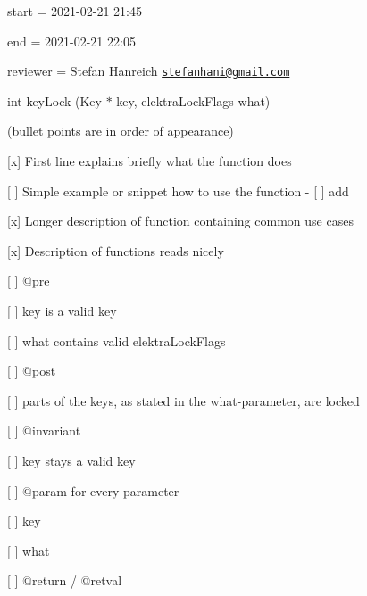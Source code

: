 
\begin{DoxyItemize}
\item start = 2021-\/02-\/21 21\+:45
\item end = 2021-\/02-\/21 22\+:05
\item reviewer = Stefan Hanreich \href{mailto:stefanhani@gmail.com}{\tt stefanhani@gmail.\+com}
\end{DoxyItemize}

{\ttfamily int key\+Lock (Key $\ast$ key, elektra\+Lock\+Flags what)}

(bullet points are in order of appearance)


\begin{DoxyItemize}
\item \mbox{[}x\mbox{]} First line explains briefly what the function does
\item \mbox{[} \mbox{]} Simple example or snippet how to use the function -\/ \mbox{[} \mbox{]} add
\item \mbox{[}x\mbox{]} Longer description of function containing common use cases
\item \mbox{[}x\mbox{]} Description of functions reads nicely
\item \mbox{[} \mbox{]} {\ttfamily @pre}
\begin{DoxyItemize}
\item \mbox{[} \mbox{]} key is a valid key
\item \mbox{[} \mbox{]} what contains valid elektra\+Lock\+Flags
\end{DoxyItemize}
\item \mbox{[} \mbox{]} {\ttfamily @post}
\begin{DoxyItemize}
\item \mbox{[} \mbox{]} parts of the keys, as stated in the what-\/parameter, are locked
\end{DoxyItemize}
\item \mbox{[} \mbox{]} {\ttfamily @invariant}
\begin{DoxyItemize}
\item \mbox{[} \mbox{]} key stays a valid key
\end{DoxyItemize}
\item \mbox{[} \mbox{]} {\ttfamily @param} for every parameter
\begin{DoxyItemize}
\item \mbox{[} \mbox{]} key
\item \mbox{[} \mbox{]} what
\end{DoxyItemize}
\item \mbox{[} \mbox{]} {\ttfamily @return} / {\ttfamily @retval}

\end{DoxyItemize}
